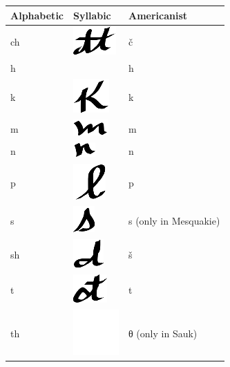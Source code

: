 \documentclass[output=paper]{LSP/langsci}
\begin{document}
\begin{table}
\begin{tabular}{lll}
\lsptoprule
Alphabetic & Syllabic & Americanist\\
\midrule
ch & \includegraphics{figures/Danker2ch} & č\\
h && h\\
k & \includegraphics{figures/Danker2k} & k\\
m & \includegraphics{figures/Danker2m} & m\\
n & \includegraphics{figures/Danker2n} & n\\
p & \includegraphics{figures/Danker2p} & p\\
s & \includegraphics{figures/Danker2s} & s (only in Mesquakie)\\
sh & \includegraphics{figures/Danker2sh} & š\\
t & \includegraphics{figures/Danker2t} & t\\
th & \includegraphics{figures/Danker2th} & θ (only in Sauk)\\

\end{tabular}
\end{table}
\end{document}
